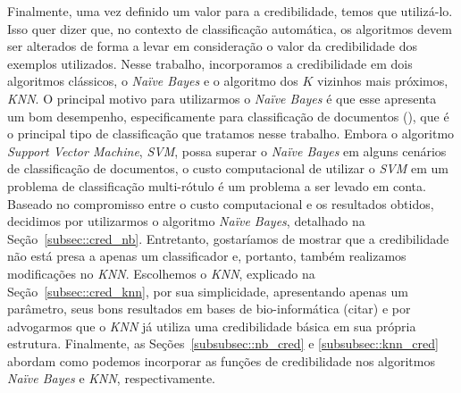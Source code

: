 Finalmente, uma vez definido um valor para a credibilidade, temos que utilizá-lo. Isso quer dizer que, no contexto de classificação automática, os algoritmos devem ser alterados de forma a levar em consideração o valor da credibilidade dos exemplos utilizados. Nesse trabalho, incorporamos a credibilidade em dois algoritmos clássicos, o \textit{Naïve Bayes} e o algoritmo dos $K$ vizinhos mais próximos, \textit{KNN}. O principal motivo para utilizarmos o \textit{Naïve Bayes} é que esse apresenta um bom desempenho, especificamente para classificação de documentos (\cite{salles10}), que é o principal tipo de classificação que tratamos nesse trabalho. Embora o algoritmo \textit{Support Vector Machine}, \textit{SVM}, possa superar o \textit{Naïve Bayes} em alguns cenários de classificação de documentos, o custo computacional de utilizar o \textit{SVM} em um problema de classificação multi-rótulo é um problema a ser levado em conta. Baseado no compromisso entre o custo computacional e os resultados obtidos, decidimos por utilizarmos o algoritmo \textit{Naïve Bayes}, detalhado na Seção~\ref{subsec::cred_nb}. Entretanto, gostaríamos de mostrar que a credibilidade não está presa a apenas um classificador e, portanto, também realizamos modificações no \textit{KNN}. Escolhemos o \textit{KNN}, explicado na Seção~\ref{subsec::cred_knn}, por sua simplicidade, apresentando apenas um parâmetro, seus bons resultados em bases de bio-informática (citar) e por advogarmos que o \textit{KNN} já utiliza uma credibilidade básica em sua própria estrutura. Finalmente, as Seções~\ref{subsubsec::nb_cred} e \ref{subsubsec::knn_cred} abordam como podemos incorporar as funções de credibilidade nos algoritmos \textit{Naïve Bayes} e \textit{KNN}, respectivamente.


